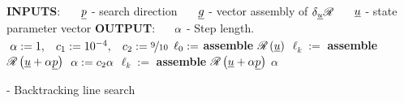 \begin{algorithm}
  \normalsize
  \begin{algorithmic}[1] 
    \State \textbf{INPUTS}:
    \State \ \ \ $\underline{p}$ - search direction
    \State \ \ \ $\underline{g}$ - vector assembly of $\delta_{\underline{u}} \mathscr{R}$
    \State \ \ \ $\phantom{\rankone{p}}\mathllap{\rankone{u}}$ - state parameter vector
    \State \textbf{OUTPUT}: 
    \State \ \ \ $\phantom{\rankone{p}}\mathllap{\alpha}$ - Step length.
    \\
    \hrulefill
      \State $\phantom{\ell_k}\mathllap{\alpha} := 1, \hspace{3mm} c_1 := 10^{-4}, \hspace{3mm} c_2 := \nicefrac{9}{10}$
      \State $\phantom{\ell_k}\mathllap{\ell_0} := $ \textbf{assemble} $\mathscr{R}\left( \underline{u} \right)$
      \State $\ell_k := $ \textbf{assemble} $\mathscr{R}\left( \underline{u} + \alpha \underline{p} \right)$
        \State $\phantom{\ell_k}\mathllap{\alpha} := c_2 \alpha$
        \State $\ell_k := $ \textbf{assemble} $\mathscr{R}\left( \underline{u} + \alpha \underline{p} \right)$
      \EndWhile
      \State \Return $\alpha$
    \EndFunction
  \end{algorithmic}
  \caption[Backtracking line-search]{ - Backtracking line search}
  \label{qn_bls_alg}
\end{algorithm}
